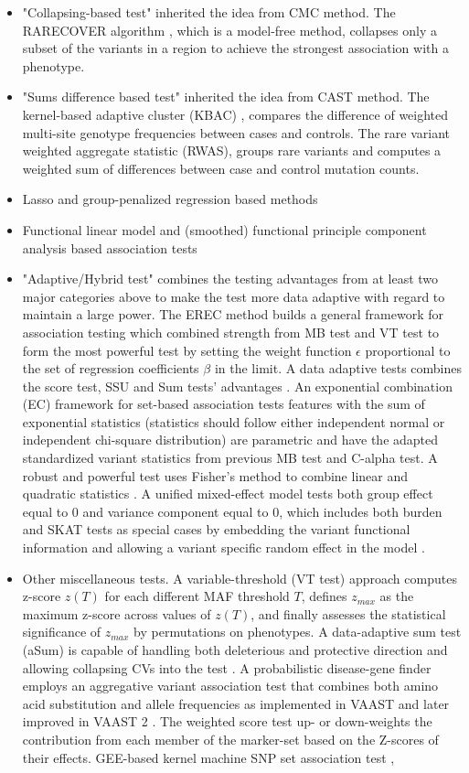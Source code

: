 \documentclass[12pt]{article}
\begin{document}
\begin{itemize}
\item "Collapsing-based test" inherited the idea from CMC method. The RARECOVER algorithm \cite{Bhatia2010}, which is a model-free method, collapses only a subset of the variants in a region to achieve the strongest association with a phenotype.   
\item "Sums difference based test" inherited the idea from CAST method. The kernel-based adaptive cluster (KBAC) \cite{Liu2010}, compares the difference of weighted multi-site genotype frequencies between cases and controls. The rare variant weighted aggregate statistic (RWAS)\cite{Sul2011}, groups rare variants and computes a weighted sum of differences between case and control mutation counts. 
\item Lasso and group-penalized regression based methods \cite{Zhou2010,Kim2014}
\item Functional linear model and (smoothed) functional principle component analysis based association tests \cite{Luo2011,Luo2012, Luo2012a,Fan2013}
\item "Adaptive/Hybrid test" combines the testing advantages from at least two major categories above to make the test more data adaptive with regard to maintain a large power. The EREC method \cite{Lin2011} builds a general framework for association testing which combined strength from MB test and VT test to form the most powerful test by setting the weight function $\epsilon$ proportional to the set of regression coefficients $\beta$ in the limit. A data adaptive tests combines the score test, SSU and Sum tests' advantages \cite{Pan2011}. An exponential combination (EC) framework for set-based association tests \cite{Chen2012} features with the sum of exponential statistics (statistics should follow either independent normal or independent chi-square distribution) are parametric and have the adapted standardized variant statistics from previous MB test and C-alpha test. A robust and powerful test uses Fisher's method to combine linear and quadratic statistics \cite{Derkach2013}. A unified mixed-effect model tests both group effect equal to 0 and variance component equal to 0, which includes both burden and SKAT tests as special cases by embedding the variant functional information and allowing a variant specific random effect in the model \cite{Sun2013}.
\item Other miscellaneous tests. A variable-threshold (VT test) approach \cite{Price2010} computes z-score $z(T)$ for each different MAF threshold $T$, defines $z_{max}$ as the maximum z-score across values of $z(T)$, and finally assesses the statistical significance of $z_{max}$ by permutations on phenotypes. A data-adaptive sum test (aSum) is capable of handling both deleterious and protective direction and allowing collapsing CVs into the test \cite{Han2010}. A probabilistic disease-gene finder employs an aggregative variant association test that combines both amino acid substitution and allele frequencies as implemented in VAAST \cite{Yandell2011} and later improved in VAAST 2 \cite{Hu2013}. The weighted score test \cite{Cai2012} up- or down-weights the contribution from each member of the marker-set based on the Z-scores of their effects. GEE-based kernel machine SNP set association test \cite{Wang2013}, 

\end{itemize}
\end{document}
